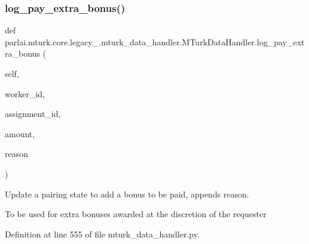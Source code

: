 \subsubsection{\texorpdfstring{log\+\_\+pay\+\_\+extra\+\_\+bonus()}{log\_pay\_extra\_bonus()}}
{\footnotesize\ttfamily def parlai.\+mturk.\+core.\+legacy\+\_.\+mturk\+\_\+data\+\_\+handler.\+M\+Turk\+Data\+Handler.\+log\+\_\+pay\+\_\+extra\+\_\+bonus (\begin{DoxyParamCaption}\item[{}]{self,  }\item[{}]{worker\+\_\+id,  }\item[{}]{assignment\+\_\+id,  }\item[{}]{amount,  }\item[{}]{reason }\end{DoxyParamCaption})}

\begin{DoxyVerb}Update a pairing state to add a bonus to be paid, appends reason.

To be used for extra bonuses awarded at the discretion of the requester
\end{DoxyVerb}
 

Definition at line 555 of file mturk\+\_\+data\+\_\+handler.\+py.


